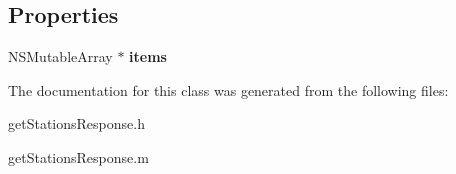 \subsection*{Properties}
\begin{DoxyCompactItemize}
\item 
\hypertarget{interfaceget_stations_response_a4926aa885af96849f9adee771a0cb712}{}N\+S\+Mutable\+Array $\ast$ {\bfseries items}\label{interfaceget_stations_response_a4926aa885af96849f9adee771a0cb712}

\end{DoxyCompactItemize}


The documentation for this class was generated from the following files\+:\begin{DoxyCompactItemize}
\item 
get\+Stations\+Response.\+h\item 
get\+Stations\+Response.\+m\end{DoxyCompactItemize}
